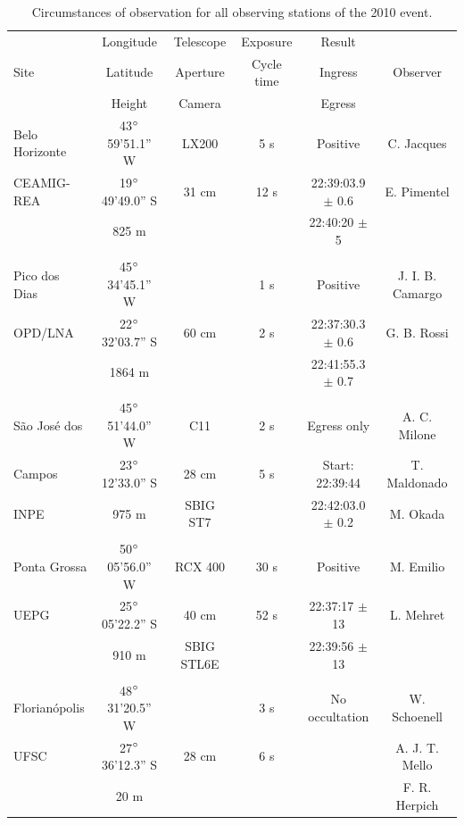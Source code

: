 \documentclass[useAMS,usenatbib]{mn2e}
\begin{document}
\begin{table}
 \centering
 \begin{minipage}{140mm}
  \caption{Circumstances of observation for all observing stations of the 2010 event. \label{Tab: obs-2010}}
  \begin{tabular}{@{}lccccc}
  \hline
          & Longitude & Telescope & Exposure & Result &   \\
     Site & Latitude  & Aperture  & Cycle time & Ingress & Observer\\          
          & Height    & Camera    &        & Egress    & \\          
\hline
 Belo Horizonte & 43$\hbox{$^\circ$}$59'51.1'' W & LX200 & 5 s & Positive & C. Jacques  \\
 CEAMIG-REA &19$\hbox{$^\circ$}$49'49.0'' S & 31 cm & 12 s & 22:39:03.9 $\pm$ 0.6 &  E. Pimentel \\
            & 825 m                &       &     & 22:40:20 $\pm$ 5 &   \\
 & & & & & \\
 Pico dos Dias    & 45$\hbox{$^\circ$}$34'45.1'' W &       & 1 s & Positive & J. I. B. Camargo \\
 OPD/LNA    &22$\hbox{$^\circ$}$32'03.7'' S & 60 cm & 2 s & 22:37:30.3 $\pm$ 0.6 &  G. B. Rossi \\
            & 1864 m               &       &     & 22:41:55.3 $\pm$ 0.7 &              \\
 & & & & & \\
 S\~ao Jos\'e dos       & 45$\hbox{$^\circ$}$51'44.0'' W &  C11  & 2 s & Egress only & A. C. Milone\\
 Campos       &23$\hbox{$^\circ$}$12'33.0'' S & 28 cm & 5 s & Start: 22:39:44 & T. Maldonado\\
 INPE      & 975 m                & SBIG ST7 &     & 22:42:03.0 $\pm$ 0.2 & M. Okada    \\
 & & & & & \\
 Ponta Grossa       & 50$\hbox{$^\circ$}$05'56.0'' W & RCX 400 &30 s & Positive & M. Emilio   \\
 UEPG       &25$\hbox{$^\circ$}$05'22.2'' S & 40 cm & 52 s & 22:37:17 $\pm$ 13 & L. Mehret   \\
            & 910 m                & SBIG STL6E &     & 22:39:56 $\pm$ 13 & \\
 & & & & & \\
 Florian\'opolis       & 48$\hbox{$^\circ$}$31'20.5'' W &       & 3 s & No occultation  & W. Schoenell\\
 UFSC       &27$\hbox{$^\circ$}$36'12.3'' S & 28 cm & 6 s&  & A. J. T. Mello\\
            & 20 m                 &       &  &         & F. R. Herpich \\
\hline
\end{tabular}
\end{minipage}
\end{table}
\end{document}
